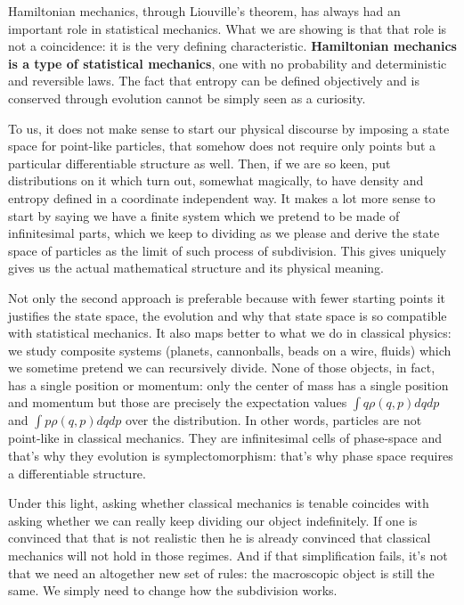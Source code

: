 \documentclass[11pt]{article}
\begin{document}
Hamiltonian mechanics, through Liouville's theorem, has always had an important role in statistical mechanics. What we are showing is that that role is not a coincidence: it is the very defining characteristic. \textbf{Hamiltonian mechanics is a type of statistical mechanics}, one with no probability and deterministic and reversible laws. The fact that entropy can be defined objectively and is conserved through evolution cannot be simply seen as a curiosity.

To us, it does not make sense to start our physical discourse by imposing a state space for point-like particles, that somehow does not require only points but a particular differentiable structure as well. Then, if we are so keen, put distributions on it which turn out, somewhat magically, to have density and entropy defined in a coordinate independent way. It makes a lot more sense to start by saying we have a finite system which we pretend to be made of infinitesimal parts, which we keep to dividing as we please and derive the state space of particles as the limit of such process of subdivision. This gives uniquely gives us the actual mathematical structure and its physical meaning.

Not only the second approach is preferable because with fewer starting points it justifies the state space, the evolution and why that state space is so compatible with statistical mechanics. It also maps better to what we do in classical physics: we study composite systems (planets, cannonballs, beads on a wire, fluids) which we sometime pretend we can recursively divide. None of those objects, in fact, has a single position or momentum: only the center of mass has a single position and momentum but those are precisely the expectation values $\int q \rho(q,p) dq dp$ and $\int p \rho(q,p) dq dp$ over the distribution. In other words, particles are not point-like in classical mechanics. They are infinitesimal cells of phase-space and that's why they evolution is symplectomorphism: that's why phase space requires a differentiable structure.

Under this light, asking whether classical mechanics is tenable coincides with asking whether we can really keep dividing our object indefinitely. If one is convinced that that is not realistic then he is already convinced that classical mechanics will not hold in those regimes. And if that simplification fails, it's not that we need an altogether new set of rules: the macroscopic object is still the same. We simply need to change how the subdivision works.
\end{document}
